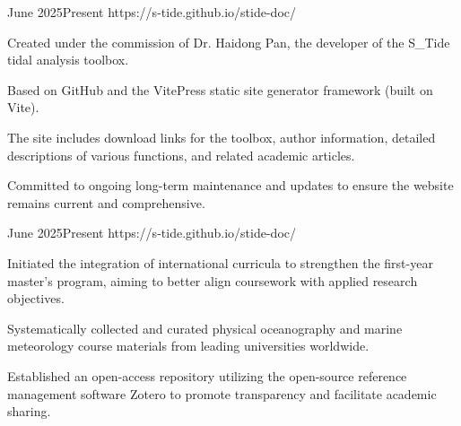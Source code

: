 \makeprojects
{


    {}
    {June 2025}{Present}
    {https://s-tide.github.io/stide-doc/}
    {
        \item Created under the commission of Dr. Haidong Pan, the developer of the S\_Tide tidal analysis toolbox.
        \item Based on GitHub and the VitePress static site generator framework (built on Vite). 
        \item The site includes download links for the toolbox, author information, detailed descriptions of various functions, and related academic articles.\vspace{-0.5mm}
        \item Committed to ongoing long-term maintenance and updates to ensure the website remains current and comprehensive.
    }

    {}
    {June 2025}{Present}
    {https://s-tide.github.io/stide-doc/}
    {
        \item Initiated the integration of international curricula to strengthen the first-year master's program, aiming to better align coursework with applied research objectives.
        \item Systematically collected and curated physical oceanography and marine meteorology course materials from leading universities worldwide.
        \item Established an open-access repository utilizing the open-source reference management software Zotero to promote transparency and facilitate academic sharing.
    }

    


}